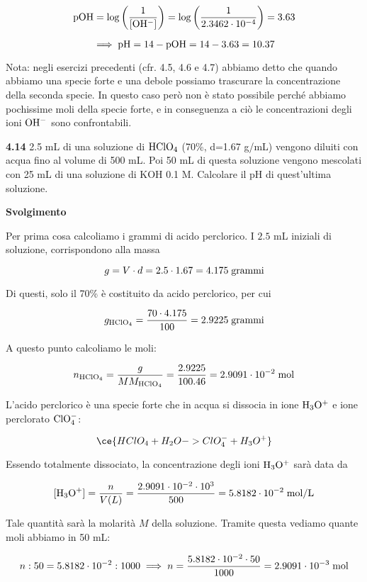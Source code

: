 $$\rm pOH=\log{\left(\frac{1}{[OH^-]}\right)}
=\log{\left(\frac{1}{2.3462 \cdot 10^{-4}}\right)}=3.63$$

$$\implies \rm pH=14-pOH=14-3.63=10.37$$

Nota: negli esercizi precedenti (cfr. 4.5, 4.6 e 4.7) abbiamo detto che quando abbiamo una specie forte e una debole possiamo trascurare la concentrazione della seconda specie. In questo caso però non è stato possibile perché abbiamo pochissime moli della specie forte, e in conseguenza a ciò le concentrazioni degli ioni $\rm OH^-$ sono confrontabili.

\vspace{0.2cm}\textbf{4.14} 2.5 mL di una soluzione di $\rm HClO_4$ (70\%, d=1.67 g/mL) vengono diluiti con acqua fino al
volume di 500 mL. Poi 50 mL di questa soluzione vengono mescolati con 25 mL di una soluzione di KOH 0.1 M. Calcolare il pH di quest'ultima soluzione.

\vspace{0.2cm}\large\textbf{Svolgimento}\normalsize

\vspace{0.2cm}Per prima cosa calcoliamo i grammi di acido perclorico. I $2.5$ mL iniziali di soluzione, corrispondono alla massa

$$g=V \cdot d=2.5 \cdot 1.67=4.175 \; \rm grammi$$

Di questi, solo il 70\% è costituito da acido perclorico, per cui

$$g_{\rm HClO_4}=\frac{70 \cdot 4.175}{100}=2.9225 \; \rm grammi$$

A questo punto calcoliamo le moli:

$$n_{\rm HClO_4}
=\frac{g}{MM_{\rm HClO_4}}
=\frac{2.9225}{100.46}=2.9091 \cdot 10^{-2} \; \rm mol$$

L'acido perclorico è una specie forte che in acqua si dissocia in ione $\rm H_3O^+$ e ione perclorato $\rm ClO_4^-$:

$$\ce{HClO_4 + H_2O -> ClO_4^- + H_3O^+}$$

Essendo totalmente dissociato, la concentrazione degli ioni $\rm H_3O^+$ sarà data da

$$[\text{H}_3\text{O}^+]=\frac{n}{V(L)}=\frac{2.9091 \cdot 10^{-2} \cdot 10^{3}}{500}=5.8182 \cdot 10^{-2} \; \rm mol/L$$

Tale quantità sarà la molarità $M$ della soluzione. Tramite questa vediamo quante moli abbiamo in 50 mL:

$$n:50=5.8182 \cdot 10^{-2}:1000
\implies
n=\frac{5.8182 \cdot 10^{-2} \cdot 50}{1000}
=2.9091 \cdot 10^{-3} \; \rm mol$$

